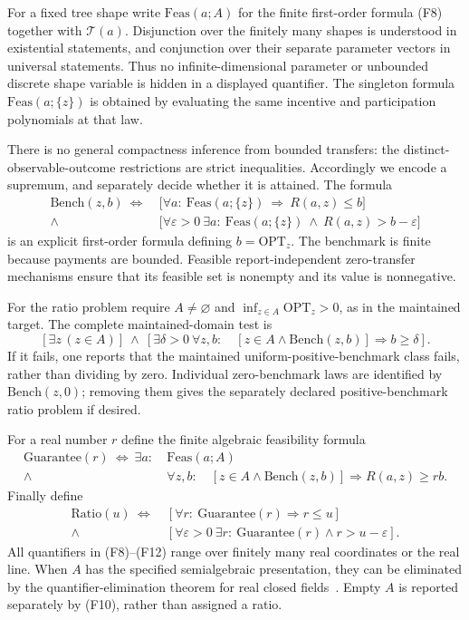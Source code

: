 \documentclass[11pt,a4paper]{article}
\begin{document}
For a fixed tree shape write $\mathrm{Feas}(a;A)$ for the finite
first-order formula \textup{(F8)} together with $\mathcal T(a)$.
Disjunction over the finitely many shapes is understood in existential
statements, and conjunction over their separate parameter vectors in
universal statements. Thus no infinite-dimensional parameter or
unbounded discrete shape variable is hidden in a displayed quantifier.
The singleton formula $\mathrm{Feas}(a;\{z\})$ is obtained by evaluating
the same incentive and participation polynomials at that law.

There is no general compactness inference from bounded transfers:
the distinct-observable-outcome restrictions are strict inequalities.
Accordingly we encode a supremum, and separately decide whether it is
attained. The formula
\begin{align*}
 \mathrm{Bench}(z,b)\ \Longleftrightarrow\
 &\bigl[\forall a:\ 
       \mathrm{Feas}(a;\{z\})\ \Longrightarrow\ R(a,z)\leq b\bigr]\\
 {}\land&
 \bigl[\forall\varepsilon>0\ \exists a:\ 
       \mathrm{Feas}(a;\{z\})\ \land\ R(a,z)>b-\varepsilon\bigr]
 \tag{F9}
\end{align*}
is an explicit first-order formula defining $b=\mathrm{OPT}_z$.
The benchmark is finite because payments are bounded. Feasible
report-independent zero-transfer mechanisms ensure that its feasible
set is nonempty and its value is nonnegative.

For the ratio problem require $A\ne\varnothing$ and
$\inf_{z\in A}\mathrm{OPT}_z>0$, as in the maintained target.
The complete maintained-domain test is
\[
 [\exists z\,(z\in A)]\ \land\
 [\exists\delta>0\ \forall z,b:\quad
   [z\in A\land\mathrm{Bench}(z,b)]\Longrightarrow b\geq\delta].
 \tag{F10}
\]
If it fails, one reports that the maintained uniform-positive-benchmark
class fails, rather than dividing by zero. Individual zero-benchmark
laws are identified by $\mathrm{Bench}(z,0)$; removing them gives the
separately declared positive-benchmark ratio problem if desired.

For a real number $r$ define the finite algebraic feasibility formula
\begin{align*}
 \mathrm{Guarantee}(r)\ \Longleftrightarrow\ \exists a:\ 
 &\mathrm{Feas}(a;A)\\
 {}\land&
 \forall z,b:\quad
 [z\in A\land\mathrm{Bench}(z,b)]
 \Longrightarrow R(a,z)\geq rb .
 \tag{F11}
\end{align*}
Finally define
\begin{align*}
 \mathrm{Ratio}(u)\ \Longleftrightarrow\
 &[\forall r:\ \mathrm{Guarantee}(r)\Longrightarrow r\leq u]\\
 {}\land&
 [\forall\varepsilon>0\ \exists r:\ 
   \mathrm{Guarantee}(r)\land r>u-\varepsilon].
 \tag{F12}
\end{align*}
All quantifiers in \textup{(F8)--(F12)} range over finitely many real
coordinates or the real line. When $A$ has the specified semialgebraic
presentation, they can be eliminated by the quantifier-elimination theorem
for real closed fields~\cite{Collins}. Empty $A$ is reported separately by
\textup{(F10)}, rather than assigned a ratio.
\end{document}
